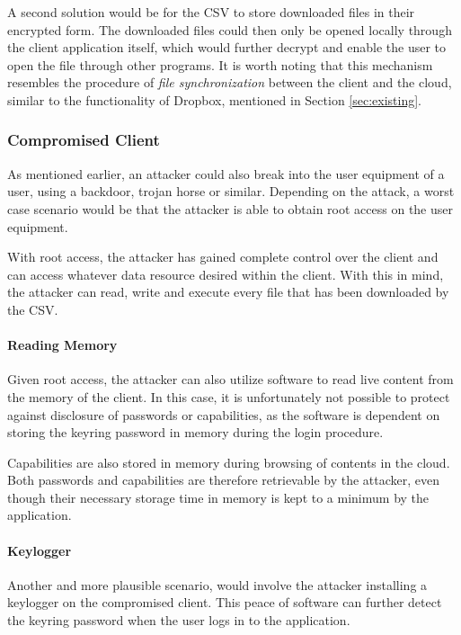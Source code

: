\documentclass[pdftex,english,10pt,b5paper,twoside]{book}
\begin{document}
A second solution would be for the \acl{CSV} to store downloaded files in their
encrypted form. The downloaded files could then only be opened locally through
the client application itself, which would further decrypt and enable the user
to open the file through other programs. It is worth noting that this
mechanism resembles the procedure of \emph{file synchronization} between the
client and the cloud, similar to the functionality of Dropbox, mentioned in
Section \ref{sec:existing}.

\subsubsection{Compromised Client}

As mentioned earlier, an attacker could also break into the user equipment of a
user, using a backdoor, trojan horse or similar. Depending on the attack, a
worst case scenario would be that the attacker is able to obtain root access on
the user equipment. 

With root access, the attacker has gained complete control over the client and
can access whatever data resource desired within the client. With this in mind,
the attacker can read, write and execute every file that has been downloaded by
the \acl{CSV}.

\paragraph{Reading Memory} Given root access, the attacker can also utilize
software to read live content from the memory of the client. In this case, it
is unfortunately not possible to protect against disclosure of passwords or
capabilities, as the software is dependent on storing the keyring password in
memory during the login procedure.

Capabilities are also stored in memory during browsing of contents in the
cloud. Both passwords and capabilities are therefore retrievable by the
attacker, even though their necessary storage time in memory is kept to a
minimum by the application. 

\paragraph{Keylogger} Another and more plausible scenario, would involve the
attacker installing a keylogger on the compromised client. This peace of
software can further detect the keyring password when the user logs in to the
application.
\end{document}
